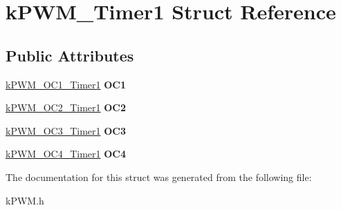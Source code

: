 \hypertarget{structkPWM__Timer1}{}\section{k\+P\+W\+M\+\_\+\+Timer1 Struct Reference}
\label{structkPWM__Timer1}
\subsection*{Public Attributes}
\begin{DoxyCompactItemize}
\item 
\hyperlink{structkPWM__OC1__Timer1}{k\+P\+W\+M\+\_\+\+O\+C1\+\_\+\+Timer1} {\bfseries O\+C1}\hypertarget{structkPWM__Timer1_a4bc27acd77e6e6c59227e8b37298dec0}{}\label{structkPWM__Timer1_a4bc27acd77e6e6c59227e8b37298dec0}

\item 
\hyperlink{structkPWM__OC2__Timer1}{k\+P\+W\+M\+\_\+\+O\+C2\+\_\+\+Timer1} {\bfseries O\+C2}\hypertarget{structkPWM__Timer1_a4a59140c4452f5b409dd0cca362165a1}{}\label{structkPWM__Timer1_a4a59140c4452f5b409dd0cca362165a1}

\item 
\hyperlink{structkPWM__OC3__Timer1}{k\+P\+W\+M\+\_\+\+O\+C3\+\_\+\+Timer1} {\bfseries O\+C3}\hypertarget{structkPWM__Timer1_a5406942d01308b7832779673819d3caa}{}\label{structkPWM__Timer1_a5406942d01308b7832779673819d3caa}

\item 
\hyperlink{structkPWM__OC4__Timer1}{k\+P\+W\+M\+\_\+\+O\+C4\+\_\+\+Timer1} {\bfseries O\+C4}\hypertarget{structkPWM__Timer1_a39276ff1f4da23e14a86d9208d97802b}{}\label{structkPWM__Timer1_a39276ff1f4da23e14a86d9208d97802b}

\end{DoxyCompactItemize}


The documentation for this struct was generated from the following file\+:\begin{DoxyCompactItemize}
\item 
k\+P\+W\+M.\+h\end{DoxyCompactItemize}
